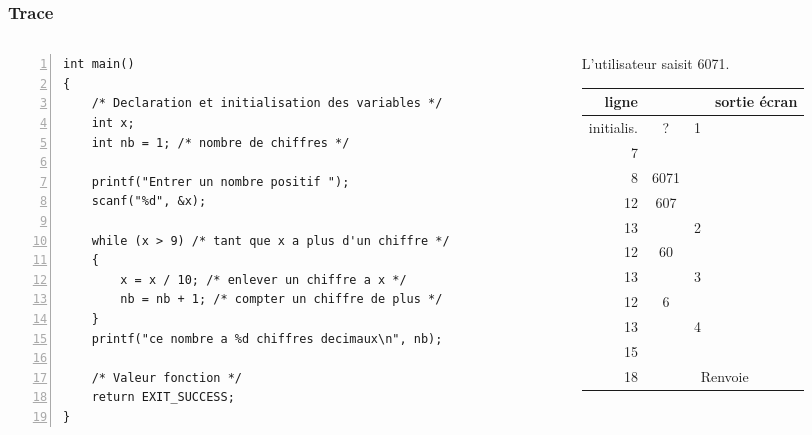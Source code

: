 \documentclass[xcolor=pdftex,svgnames,table]{beamer}
\begin{document}
\begin{frame}[fragile]
  \frametitle{Trace}
\begin{columns}
  \begin{column}[t]{3.7cm}
 \begin{lstlisting}[numbers=left,basicstyle=\ttfamily\scriptsize]
int main()
{
    /* Declaration et initialisation des variables */
    int x;
    int nb = 1; /* nombre de chiffres */

    printf("Entrer un nombre positif ");
    scanf("%d", &x);

    while (x > 9) /* tant que x a plus d'un chiffre */
    {
        x = x / 10; /* enlever un chiffre a x */
        nb = nb + 1; /* compter un chiffre de plus */
    }
    printf("ce nombre a %d chiffres decimaux\n", nb);

    /* Valeur fonction */
    return EXIT_SUCCESS;
}
\end{lstlisting}
\vspace{.4cm}
  \end{column}
\begin{column}[t]{4cm}
\scriptsize
\pause
L'utilisateur saisit 6071.

\begin{tabular}{|r|c|c|l|}
\hline
    ligne & \C{x} & \C{nb} & sortie écran \pause \\ \hline
  initialis.& ? &  1 & \pause \\
7 &  &  & \C{Entrer\ldots}\pause \\
8 &  6071 &  & \pause\\
12 &  607 &  & \pause \\
13 &   & 2 & \pause\\
12 &  60 &  & \pause\\
13 &   & 3 & \pause \\
12 &  6 &  & \pause\\
13 &   & 4 &  \pause \\
15 & & & \C{ce nombre a 4...}\pause \\
18 & \multicolumn{3}{c}{Renvoie \C{EXIT\_SUCCESS}}
\end{tabular}
 \end{column}
\end{columns}
\end{frame}
\end{document}
